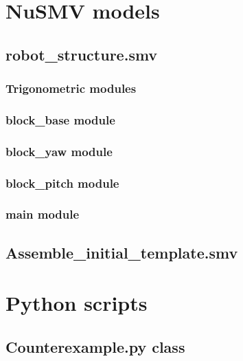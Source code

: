 \section{NuSMV models}
\subsection{robot\_structure.smv}
\subsubsection{Trigonometric modules}

\subsubsection{block\_base module}

\subsubsection{block\_yaw module}

\subsubsection{block\_pitch module}

\subsubsection{main module}

\subsection{Assemble\_initial\_template.smv}


\newpage
\section{Python scripts}
\subsection{Counterexample.py class}
\label{ch:counterexamplePy}


